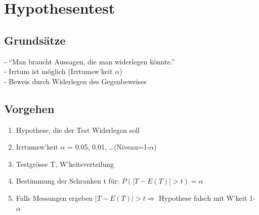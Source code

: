 \section{Hypothesentest }
	\subsection{Grundsätze}
	- ``Man braucht Aussagen, die man widerlegen könnte.''\\
	- Irrtum ist möglich (Irrtumsw'keit $\alpha$)\\
	- Beweis durch Widerlegen des Gegenbeweises
	\subsection{Vorgehen}
	\begin{enumerate}
      \item Hypothese, die der Test Widerlegen soll
      \item Irrtumsw'keit $\alpha$ = 0.05, 0.01, \ldots (Niveau=1-$\alpha$)
      \item Testgrösse T, W'keitsverteilung
      \item Bestimmung der Schranken t für: $P(|T-E(T)|>t)=\alpha$
      \item Falls Messungen ergeben $|T-E(T)|>t \Longrightarrow$ Hypothese
      falsch mit W'keit 1- $\alpha$
    \end{enumerate}
    
    
